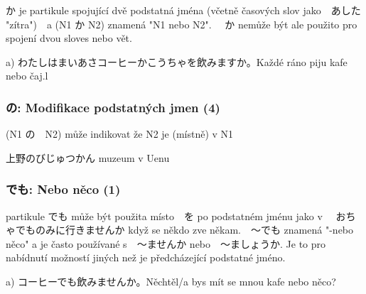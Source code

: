 か je partikule spojující dvě podstatná jména (včetně časových slov jako　あした "zítra")　a (N1 か N2) znamená "N1 nebo N2". 　か nemůže být ale použito pro spojení dvou sloves nebo vět.

a) わたしはまいあさコーヒーかこうちゃを飲みますか。Každé ráno piju kafe nebo čaj.l

\subsubsection{の: Modifikace podstatných jmen (4)}

(N1 の　N2) může indikovat že N2 je (místně) v N1

上野のびじゅつかん muzeum v Uenu


\subsubsection{でも: Nebo něco (1)}

partikule でも může být použita místo　を po podstatném jménu jako v 　おちゃでものみに行きませんか když se někdo zve někam.　〜でも znamená "-nebo něco" a je často používané s　〜ませんか nebo　〜ましょうか. Je to pro nabídnutí možností jiných než je předcházející podstatné jméno.

a) コーヒーでも飲みませんか。Něchtěl/a bys mít se mnou kafe nebo něco?






















